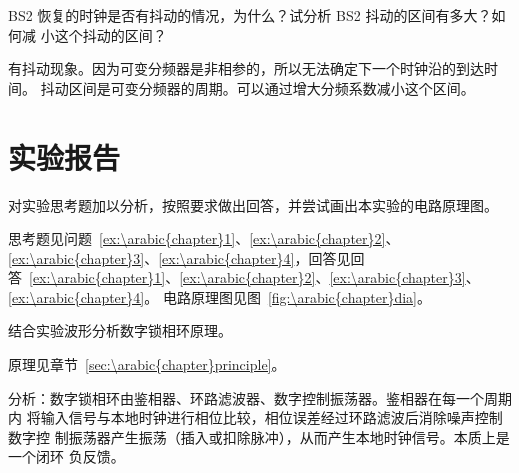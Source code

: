 \documentclass[../main]{subfiles}
\begin{document}
\begin{Exercise}[title = 思考, label = ex:\arabic{chapter}\arabic{Exercise}]
  BS2 恢复的时钟是否有抖动的情况，为什么？试分析 BS2 抖动的区间有多大？如何减
  小这个抖动的区间？
\end{Exercise}

\begin{Answer}
  有抖动现象。因为可变分频器是非相参的，所以无法确定下一个时钟沿的到达时间。
  抖动区间是可变分频器的周期。可以通过增大分频系数减小这个区间。
\end{Answer}

\section{实验报告}%
\label{sec:\arabic{chapter}report}

\begin{Exercise}
  对实验思考题加以分析，按照要求做出回答，并尝试画出本实验的电路原理图。
\end{Exercise}

\begin{Answer}
  思考题见问题~\ref{ex:\arabic{chapter}1}、\ref{ex:\arabic{chapter}2}、\ref{ex:\arabic{chapter}3}、\ref{ex:\arabic{chapter}4}，回答见回答~\ref{ex:\arabic{chapter}1}、\ref{ex:\arabic{chapter}2}、\ref{ex:\arabic{chapter}3}、\ref{ex:\arabic{chapter}4}。
  电路原理图见图~\ref{fig:\arabic{chapter}dia}。
\end{Answer}

\begin{Exercise}
  结合实验波形分析数字锁相环原理。
\end{Exercise}

\begin{Answer}
  原理见章节~\ref{sec:\arabic{chapter}principle}。

  分析：数字锁相环由鉴相器、环路滤波器、数字控制振荡器。鉴相器在每一个周期内
  将输入信号与本地时钟进行相位比较，相位误差经过环路滤波后消除噪声控制数字控
  制振荡器产生振荡（插入或扣除脉冲），从而产生本地时钟信号。本质上是一个闭环
  负反馈。
\end{Answer}
\end{document}
